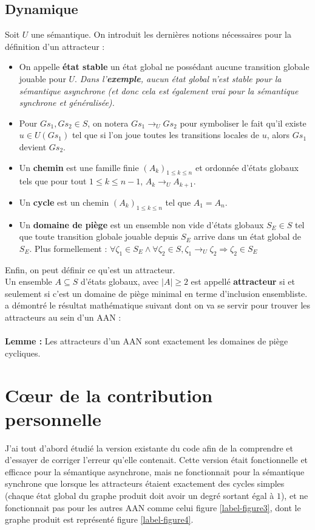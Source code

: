 \documentclass[10pt,a4paper]{article}
\begin{document}
\subsection{Dynamique}
Soit $U$ une sémantique. On introduit les dernières notions nécessaires pour la définition d'un attracteur :
\begin{itemize}
	\item On appelle \textbf{état stable} un état global ne possédant aucune transition globale jouable pour $U$.
	\emph{Dans l'\textbf{exemple}, aucun état global n'est stable pour la sémantique asynchrone (et donc cela est également vrai pour la sémantique synchrone et généralisée).}
	\item Pour $Gs_1,Gs_2\in S$, on notera $Gs_1\rightarrow _UGs_2$ pour symboliser le fait qu'il existe $u\in U(Gs_1)$ tel que si l'on joue toutes les transitions locales de $u$, alors $Gs_1$ devient $Gs_2$.
	\item Un \textbf{chemin} est une famille finie $(A_k)_{1\leq k\leq n}$ et ordonnée d'états globaux tels que pour tout $1\leq k\leq n-1$, $A_k\rightarrow _U A_{k+1}$.
	\item Un \textbf{cycle} est un chemin $(A_k)_{1\leq k\leq n}$ tel que $A_1=A_n$.
	\item Un \textbf{domaine de piège} est un ensemble non vide d'états globaux $S_E\in S$ tel que toute transition globale jouable depuis $S_E$ arrive dans un état global de $S_E$. Plus formellement : 
	$\forall\zeta _1\in S_E \wedge\forall\zeta _2\in S, \zeta _1 \rightarrow _U\zeta _2 \Rightarrow\zeta _2\in S_E$
\end{itemize}
Enfin, on peut définir ce qu'est un attracteur.\\
Un ensemble $A\subseteq S$ d'états globaux, avec $|A|\geq2$ est appellé \textbf{attracteur} si et seulement si c'est un domaine de piège minimal en terme d'inclusion ensembliste.\\
\cite{chapitre} a démontré le résultat mathématique suivant dont on va se servir pour trouver les attracteurs au sein d'un AAN :\\ \\
\textbf{Lemme :} Les attracteurs d'un AAN sont exactement les domaines de piège cycliques.

\section{Cœur de la contribution personnelle}
\label{ccp}
\hypertarget{debutpartie4}{
J'ai tout d'abord étudié la version existante du code afin de la comprendre et d'essayer de corriger l'erreur qu'elle contenait. Cette version était fonctionnelle et efficace pour la sémantique asynchrone, mais ne fonctionnait pour 
la sémantique synchrone que lorsque les attracteurs étaient exactement des cycles simples (chaque état global du graphe produit doit avoir un degré sortant égal à $1$), et ne fonctionnait pas pour les autres AAN comme 
celui figure \ref{label-figure3}, dont le graphe produit est représenté figure \ref{label-figure4}.\\ \\ \\
}
\end{document}
